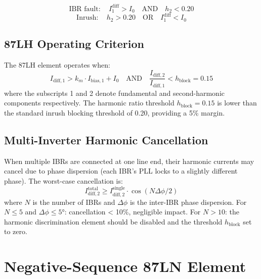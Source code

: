 \begin{equation}
  \text{IBR fault}: \quad I_1^\mathrm{diff} > I_0
  \quad\text{AND}\quad h_2 < 0.20
  \label{eq:ch4_87lh_ibr}
\end{equation}
\begin{equation}
  \text{Inrush}: \quad h_2 > 0.20
  \quad\text{OR}\quad I_1^\mathrm{diff} < I_0
  \label{eq:ch4_87lh_inrush}
\end{equation}

\subsection{87LH Operating Criterion}

The 87LH element operates when:
\begin{equation}
  I_\mathrm{diff,1} > k_m \cdot I_\mathrm{bias,1} + I_0
  \quad\text{AND}\quad \frac{I_\mathrm{diff,2}}{I_\mathrm{diff,1}} < h_\mathrm{block} = 0.15
  \label{eq:ch4_87lh_criterion}
\end{equation}
where the subscripts 1 and 2 denote fundamental and second-harmonic
components respectively. The harmonic ratio threshold $h_\mathrm{block} = 0.15$
is lower than the standard inrush blocking threshold of 0.20, providing
a 5\% margin.

\subsection{Multi-Inverter Harmonic Cancellation}

When multiple IBRs are connected at one line end, their harmonic currents
may cancel due to phase dispersion (each IBR's PLL locks to a slightly
different phase). The worst-case cancellation is:
\begin{equation}
  I_\mathrm{diff,2}^\mathrm{total} \geq I_\mathrm{diff,2}^\mathrm{single} \cdot \cos(N\Delta\phi/2)
  \label{eq:ch4_harmonic_cancel}
\end{equation}
where $N$ is the number of IBRs and $\Delta\phi$ is the inter-IBR phase
dispersion. For $N \leq 5$ and $\Delta\phi \leq 5°$: cancellation < 10\%,
negligible impact. For $N > 10$: the harmonic discrimination element
should be disabled and the threshold $h_\mathrm{block}$ set to zero.

\section{Negative-Sequence 87LN Element}
\label{sec:ch4_87ln}

